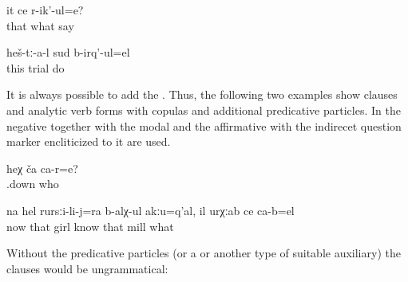 \begin{description}
\begin{exe}
\begin{xlist}
		\ex	\label{ex:What is she saying minor}
		\gll	it	ce	r-ik'-ul=e?\\
			that	what	say\\
		\glt	{}

		\ex	\label{ex:They are probably making a trial minor}
		\gll	heš-tː-a-l	sud	b-irq'-ul=el\\
			this	trial	do\\
		\glt	{}
	\end{xlist}
\end{exe}
\end{description}

It is always possible to add the . Thus, the following two examples show  clauses and analytic verb forms with copulas and additional predicative particles. In  the negative  together with the modal  and the affirmative  with the indirecet question marker encliticized to it are used.

\begin{exe}
	\ex	\label{ex:Who is she minor}
	\gll	heχ	ča 	ca-r=e?\\
		.down	who	\\
	\glt	{}

	\ex	\label{ex:na hel rursilijra balxul akuqal il urxab ce cabel minor}
	\gll	na	hel	rursːi-li-j=ra	b-alχ-ul akːu=q'al,	il	urχːab	ce	ca-b=el\\
		now	that	girl	know		that	mill	what	\\
	\glt	{}
\end{exe}

Without the predicative particles (or a  or another type of suitable auxiliary) the  clauses would be ungrammatical:

\begin{exe}


\end{exe}

